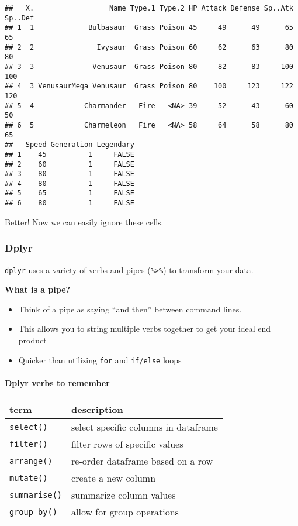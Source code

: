 \documentclass[
]{article}
\begin{document}
\begin{verbatim}
##   X.                  Name Type.1 Type.2 HP Attack Defense Sp..Atk Sp..Def
## 1  1             Bulbasaur  Grass Poison 45     49      49      65      65
## 2  2               Ivysaur  Grass Poison 60     62      63      80      80
## 3  3              Venusaur  Grass Poison 80     82      83     100     100
## 4  3 VenusaurMega Venusaur  Grass Poison 80    100     123     122     120
## 5  4            Charmander   Fire   <NA> 39     52      43      60      50
## 6  5            Charmeleon   Fire   <NA> 58     64      58      80      65
##   Speed Generation Legendary
## 1    45          1     FALSE
## 2    60          1     FALSE
## 3    80          1     FALSE
## 4    80          1     FALSE
## 5    65          1     FALSE
## 6    80          1     FALSE
\end{verbatim}

Better! Now we can easily ignore these cells.

\hypertarget{dplyr}{%
\subsubsection{Dplyr}\label{dplyr}}

\texttt{dplyr} uses a variety of verbs and pipes
(\texttt{\%\textgreater{}\%}) to transform your data.

\textbf{What is a pipe?}

\begin{itemize}
\item
  Think of a pipe as saying ``and then'' between command lines.
\item
  This allows you to string multiple verbs together to get your ideal
  end product
\item
  Quicker than utilizing \texttt{for} and \texttt{if/else} loops
\end{itemize}

\hypertarget{dplyr-verbs-to-remember}{%
\paragraph{Dplyr verbs to remember}\label{dplyr-verbs-to-remember}}

\begin{longtable}[]{@{}ll@{}}
\toprule
term & description \\
\midrule
\endhead
\texttt{select()} & select specific columns in dataframe \\
\texttt{filter()} & filter rows of specific values \\
\texttt{arrange()} & re-order dataframe based on a row \\
\texttt{mutate()} & create a new column \\
\texttt{summarise()} & summarize column values \\
\texttt{group\_by()} & allow for group operations \\
\bottomrule
\end{longtable}
\end{document}
